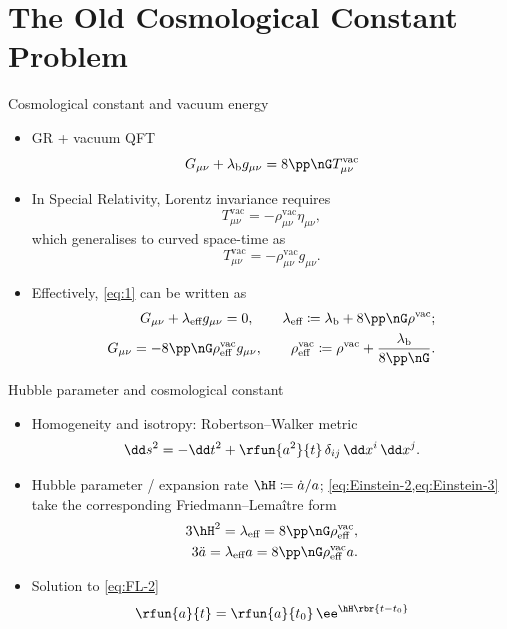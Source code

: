\documentclass{beamer}
\begin{document}
\section{The Old Cosmological Constant Problem}

\begin{frame}{Cosmological constant and vacuum energy}
\begin{itemize}
\item GR + vacuum QFT
\begin{equation}
G_{\mu\nu} + \lambda_\text{b} g_{\mu\nu} = 8\pp\nG T^\text{vac}_{\mu\nu}
\label{eq:1}
\end{equation}
\item In Special Relativity, Lorentz invariance requires
\begin{equation}
T^\text{vac}_{\mu\nu} = -\rho^\text{vac}_{\mu\nu} \eta_{\mu\nu},
\end{equation}
which generalises to curved space-time as
\begin{equation}
T^\text{vac}_{\mu\nu} = -\rho^\text{vac}_{\mu\nu} g_{\mu\nu}.
\end{equation}
\item Effectively, \cref{eq:1} can be written as
\begin{align}
G_{\mu\nu} + \lambda_\text{eff} g_{\mu\nu} = 0, \qquad
\lambda_\text{eff} \coloneqq \lambda_\text{b} + 8\pp\nG\rho^\text{vac};
\label{eq:Einstein-2}\\
G_{\mu\nu} = -8\pp\nG\rho^\text{vac}_\text{eff} g_{\mu\nu}, \qquad
\rho^\text{vac}_\text{eff} \coloneqq \rho^\text{vac} +
\frac{\lambda_\text{b}}{8\pp\nG}.
\label{eq:Einstein-3}
\end{align}
\end{itemize}
\end{frame}

\begin{frame}{Hubble parameter and cosmological constant}
\begin{itemize}
\item Homogeneity and isotropy: Robertson--Walker metric
\begin{equation}
\dd s^2 = -\dd t^2 + \rfun{a^2}{t}\,\delta_{ij}\,\dd x^i\,\dd x^j.
\end{equation}
\item Hubble parameter / expansion rate $\hH \coloneqq \dot{a}/a$;
\cref{eq:Einstein-2,eq:Einstein-3} take the corresponding Friedmann--Lemaître
form
\begin{align}
3\hH^2 = \lambda_\text{eff} = 8\pp\nG\rho^\text{vac}_\text{eff},\\
3\ddot{a} = \lambda_\text{eff} a = 8\pp\nG\rho^\text{vac}_\text{eff} a.
\label{eq:FL-2}
\end{align}

\item Solution to \cref{eq:FL-2}
\begin{equation}
\rfun{a}{t} = \rfun{a}{t_0}\,\ee^{\hH \rbr{t-t_0}}
\end{equation}

\end{itemize}

\end{frame}
\end{document}
